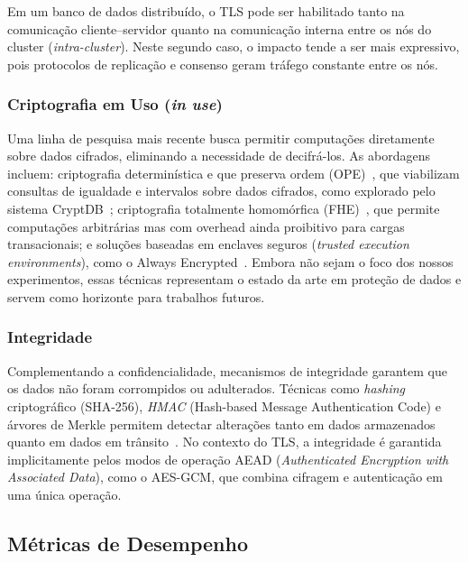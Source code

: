 \documentclass[12pt]{article}
\begin{document}
Em um banco de dados distribuído, o TLS pode ser habilitado tanto na
comunicação cliente--servidor quanto na comunicação interna entre os nós do
cluster (\emph{intra-cluster}). Neste segundo caso, o impacto tende a ser mais
expressivo, pois protocolos de replicação e consenso geram tráfego constante
entre os nós.

\subsubsection{Criptografia em Uso (\emph{in use})}

Uma linha de pesquisa mais recente busca permitir computações diretamente sobre
dados cifrados, eliminando a necessidade de decifrá-los. As abordagens
incluem: criptografia determinística e que preserva ordem
(OPE)~\cite{boldyreva2009ope}, que viabilizam consultas de igualdade e
intervalos sobre dados cifrados, como explorado pelo sistema
CryptDB~\cite{popa2011cryptdb}; criptografia totalmente homomórfica
(FHE)~\cite{gentry2009fhe}, que permite computações arbitrárias mas com
overhead ainda proibitivo para cargas transacionais; e soluções baseadas em
enclaves seguros (\emph{trusted execution environments}), como o Always
Encrypted~\cite{antonopoulos2020alwaysencrypted}. Embora não sejam o foco dos
nossos experimentos, essas técnicas representam o estado da arte em proteção de
dados e servem como horizonte para trabalhos futuros.

\subsubsection{Integridade}

Complementando a confidencialidade, mecanismos de integridade garantem que os
dados não foram corrompidos ou adulterados. Técnicas como \emph{hashing}
criptográfico (SHA-256), \emph{HMAC} (Hash-based Message Authentication Code) e
árvores de Merkle permitem detectar alterações tanto em dados armazenados quanto
em dados em trânsito~\cite{nist2020sp80053r5}. No contexto do TLS, a
integridade é garantida implicitamente pelos modos de operação AEAD
(\emph{Authenticated Encryption with Associated Data}), como o AES-GCM, que
combina cifragem e autenticação em uma única operação.

\subsection{Métricas de Desempenho}
\label{sec:conc-metricas}
\end{document}
